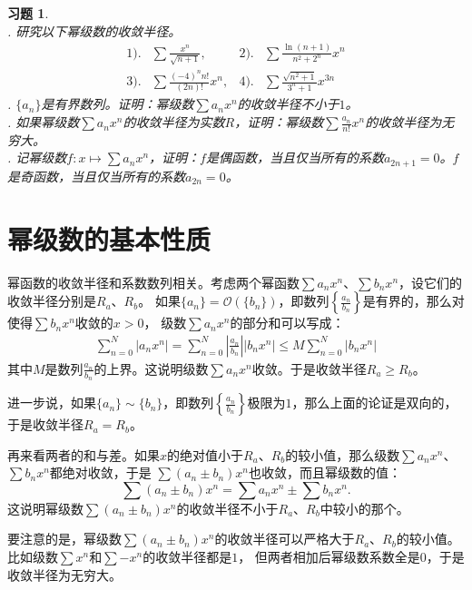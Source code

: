 \documentclass[12pt,UTF8]{ctexbook}
\newcommand{\Olim}[1]{\mathcal{O}\left(#1\right)}  %
\theoremstyle{definition}
\theoremstyle{plain}
\newtheorem{xt}{习题}[section]
\begin{document}
\begin{xt}    
    \mbox{} \\
    . 研究以下幂级数的收敛半径。\\
    \begin{align*}
        1).& \sum \frac{x^n}{\sqrt{n+1}} ,  &2).& \sum \frac{\ln{(n+1)}}{n^2 + 2^n} x^n \\
        3).& \sum \frac{(-4)^n n!}{(2n)!} x^n,  & 4).& \sum \frac{\sqrt{n^2+1}}{3^n+1} x^{3n} 
    \end{align*}
    . $\{a_n\}$是有界数列。证明：幂级数$\sum a_n x^n$的收敛半径不小于$1$。\\
    . 如果幂级数$\sum a_n x^n$的收敛半径为实数$R$，证明：幂级数$\sum \frac{a_n}{n!} x^n$的收敛半径为无穷大。\\
    . 记幂级数$f: x\mapsto \sum a_n x^n $，证明：$f$是偶函数，当且仅当所有的系数$a_{2n+1} = 0$。$f$是奇函数，当且仅当所有的系数$a_{2n} = 0$。
\end{xt}

\section{幂级数的基本性质}

幂函数的收敛半径和系数数列相关。考虑两个幂函数$\sum a_n x^n$、$\sum b_n x^n$，设它们的收敛半径分别是$R_a$、$R_b$。
如果$\{a_n\} = \Olim{\{b_n\}}$，即数列$\left\{\frac{a_n}{b_n}\right\}$是有界的，那么对使得$\sum b_n x^n$收敛的$x>0$，
级数$\sum a_n x^n$的部分和可以写成：
\begin{align*}
    \sum_{n=0}^{N} |a_n x^n| = \sum_{n=0}^{N} \left|\frac{a_n}{b_n}\right| |b_n x^n| \leqslant M \sum_{n=0}^{N} |b_n x^n|
\end{align*}
其中$M$是数列$\frac{a_n}{b_n}$的上界。这说明级数$\sum a_n x^n$收敛。于是收敛半径$R_a \geqslant R_b$。

进一步说，如果$\{a_n\} \sim \{b_n\}$，即数列$\left\{\frac{a_n}{b_n}\right\}$极限为$1$，那么上面的论证是双向的，于是收敛半径$R_a = R_b$。

再来看两者的和与差。如果$x$的绝对值小于$R_a$、$R_b$的较小值，那么级数$\sum a_n x^n$、$\sum b_n x^n$都绝对收敛，于是
$\sum (a_n \pm b_n) x^n$也收敛，而且幂级数的值：
$$\sum (a_n \pm b_n) x^n = \sum a_n x^n \pm \sum b_n x^n.$$
这说明幂级数$\sum (a_n \pm b_n) x^n$的收敛半径不小于$R_a$、$R_b$中较小的那个。

要注意的是，幂级数$\sum (a_n \pm b_n) x^n$的收敛半径可以严格大于$R_a$、$R_b$的较小值。比如级数$\sum x^n$和$\sum -x^n$的收敛半径都是$1$，
但两者相加后幂级数系数全是$0$，于是收敛半径为无穷大。
\end{document}

